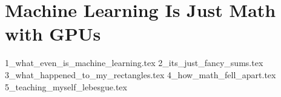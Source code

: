 \section{Machine Learning Is Just Math with GPUs}

{1_what_even_is_machine_learning.tex}
{2_its_just_fancy_sums.tex}
{3_what_happened_to_my_rectangles.tex}
{4_how_math_fell_apart.tex}
{5_teaching_myself_lebesgue.tex}




























